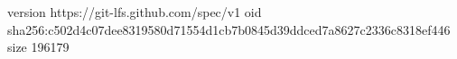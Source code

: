 version https://git-lfs.github.com/spec/v1
oid sha256:c502d4c07dee8319580d71554d1cb7b0845d39ddced7a8627c2336c8318ef446
size 196179
